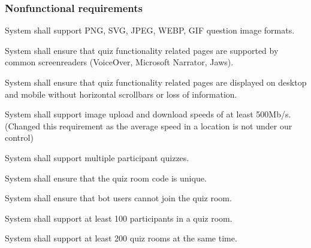 \subsubsection{Nonfunctional requirements}


\begin{nfrlist}
    \item System shall support PNG, SVG, JPEG, WEBP, GIF question image formats.
    \item System shall ensure that quiz functionality related pages are supported by common screenreaders (VoiceOver, Microsoft Narrator, Jaws).
    \item System shall ensure that quiz functionality related pages are displayed on desktop and mobile without horizontal scrollbars or loss of information.
    \item System shall support image upload and download speeds of at least 500Mb/s. (Changed this requirement as the average speed in a location is not under our control)
    \item System shall support multiple participant quizzes.
    \item System shall ensure that the quiz room code is unique.
    \item System shall ensure that bot users cannot join the quiz room.
    \item System shall support at least 100 participants in a quiz room.
    \item System shall support at least 200 quiz rooms at the same time.
\end{nfrlist}
